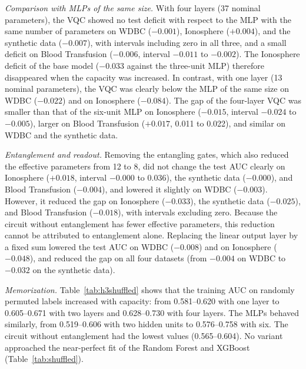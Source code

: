 \textit{Comparison with MLPs of the same size.} With four layers (37 nominal parameters), the VQC showed no test deficit with respect to the MLP with the same number of parameters on WDBC ($-0.001$), Ionosphere ($+0.004$), and the synthetic data ($-0.007$), with intervals including zero in all three, and a small deficit on Blood Transfusion ($-0.006$, interval $-0.011$ to $-0.002$). The Ionosphere deficit of the base model ($-0.033$ against the three-unit MLP) therefore disappeared when the capacity was increased. In contrast, with one layer (13 nominal parameters), the VQC was clearly below the MLP of the same size on WDBC ($-0.022$) and on Ionosphere ($-0.084$). The gap of the four-layer VQC was smaller than that of the six-unit MLP on Ionosphere ($-0.015$, interval $-0.024$ to $-0.005$), larger on Blood Transfusion ($+0.017$, 0.011 to 0.022), and similar on WDBC and the synthetic data.

\textit{Entanglement and readout.} Removing the entangling gates, which also reduced the effective parameters from 12 to 8, did not change the test AUC clearly on Ionosphere ($+0.018$, interval $-0.000$ to 0.036), the synthetic data ($-0.000$), and Blood Transfusion ($-0.004$), and lowered it slightly on WDBC ($-0.003$). However, it reduced the gap on Ionosphere ($-0.033$), the synthetic data ($-0.025$), and Blood Transfusion ($-0.018$), with intervals excluding zero. Because the circuit without entanglement has fewer effective parameters, this reduction cannot be attributed to entanglement alone. Replacing the linear output layer by a fixed sum lowered the test AUC on WDBC ($-0.008$) and on Ionosphere ($-0.048$), and reduced the gap on all four datasets (from $-0.004$ on WDBC to $-0.032$ on the synthetic data).

\textit{Memorization.} Table~\ref{tab:h3shuffled} shows that the training AUC on randomly permuted labels increased with capacity: from 0.581--0.620 with one layer to 0.605--0.671 with two layers and 0.628--0.730 with four layers. The MLPs behaved similarly, from 0.519--0.606 with two hidden units to 0.576--0.758 with six. The circuit without entanglement had the lowest values (0.565--0.604). No variant approached the near-perfect fit of the Random Forest and XGBoost (Table~\ref{tab:shuffled}).

